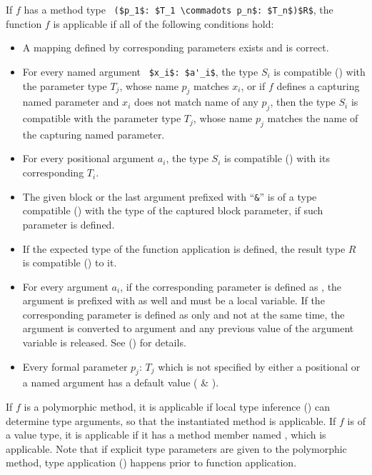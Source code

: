 If $f$ has a method type ~\lstinline!($p_1$: $T_1 \commadots p_n$: $T_n$)$R$!, the function $f$ is applicable if all of the following conditions hold:
\begin{itemize}

  \item A mapping defined by corresponding parameters exists and is correct. 

  \item For every named argument ~\lstinline!$x_i$: $a'_i$!, the type $S_i$ is compatible () with the parameter type $T_j$, whose name $p_j$ matches $x_i$, or if $f$ defines a capturing named parameter and $x_i$ does not match name of any $p_j$, then the type $S_i$ is compatible with the parameter type $T_j$, whose name $p_j$ matches the name of the capturing named parameter.

  \item For every positional argument $a_i$, the type $S_i$ is compatible () with its corresponding $T_i$. 

  \item The given block or the last argument prefixed with ``\lstinline!&!'' is of a type compatible () with the type of the captured block parameter, if such parameter is defined. 

  \item If the expected type of the function application is defined, the result type $R$ is compatible () to it. 

  \item For every argument $a_i$, if the corresponding parameter is defined as , the argument is prefixed with  as well and must be a local variable. If the corresponding parameter is defined as only  and not  at the same time, the argument is converted to  argument and any previous value of the argument variable is released. See () for details. 

  \item Every formal parameter $p_j$: $T_j$ which is not specified by either a positional or a named argument has a default value ( \& ). 
  
\end{itemize}

If $f$ is a polymorphic method, it is applicable if local type inference () can determine type arguments, so that the instantiated method is applicable. If $f$ is of a value type, it is applicable if it has a method member named , which is applicable. Note that if explicit type parameters are given to the polymorphic method, type application () happens prior to function application. 


